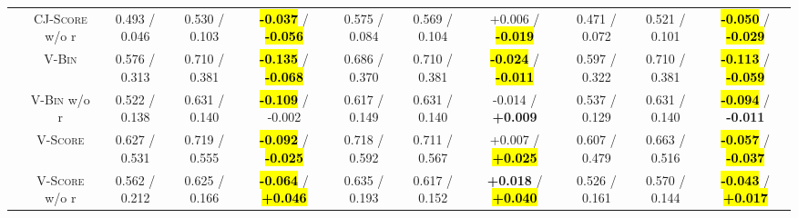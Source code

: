 \begin{table}[!t]
\begin{tabular}{@{}c|c|ccc|ccc|ccc@{}}
                    & \textsc{CJ-Score} w/o r  & 0.493 / 0.046    & 0.530 / 0.103    & \hl{\textbf{-0.037}} / \hl{\textbf{-0.056}}  & 0.575 / 0.084    & 0.569 / 0.104    & +0.006 / \hl{\textbf{-0.019}}                & 0.471 / 0.072    & 0.521 / 0.101    & \hl{\textbf{-0.050}} / \hl{\textbf{-0.029}}  \\
        \cmidrule{2-11}
                    & \textsc{V-Bin}           & 0.576 / 0.313    & 0.710 / 0.381    & \hl{\textbf{-0.135}} / \hl{\textbf{-0.068}}  & 0.686 / 0.370    & 0.710 / 0.381    & \hl{\textbf{-0.024}} / \hl{\textbf{-0.011}}  & 0.597 / 0.322    & 0.710 / 0.381    & \hl{\textbf{-0.113}} / \hl{\textbf{-0.059}}  \\
                    & \textsc{V-Bin} w/o r     & 0.522 / 0.138    & 0.631 / 0.140    & \hl{\textbf{-0.109}} / -0.002                & 0.617 / 0.149    & 0.631 / 0.140    & -0.014 / \textbf{+0.009}                     & 0.537 / 0.129    & 0.631 / 0.140    & \hl{\textbf{-0.094}} / \textbf{-0.011}       \\
                    & \textsc{V-Score}         & 0.627 / 0.531    & 0.719 / 0.555    & \hl{\textbf{-0.092}} / \hl{\textbf{-0.025}}  & 0.718 / 0.592    & 0.711 / 0.567    & +0.007 / \hl{\textbf{+0.025}}                & 0.607 / 0.479    & 0.663 / 0.516    & \hl{\textbf{-0.057}} / \hl{\textbf{-0.037}}  \\
                    & \textsc{V-Score} w/o r   & 0.562 / 0.212    & 0.625 / 0.166    & \hl{\textbf{-0.064}} / \hl{\textbf{+0.046}}  & 0.635 / 0.193    & 0.617 / 0.152    & \textbf{+0.018} / \hl{\textbf{+0.040}}       & 0.526 / 0.161    & 0.570 / 0.144    & \hl{\textbf{-0.043}} / \hl{\textbf{+0.017}}  \\
        \bottomrule
    \end{tabular}
\end{table}